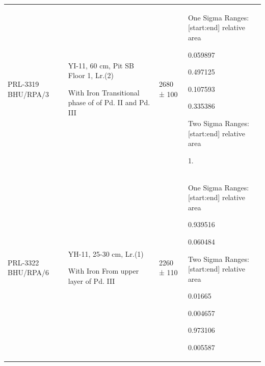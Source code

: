 {{{\begin{longtable}{|p{1.3cm}|p{1.6cm}|p{1.6cm}|p{4.4cm}|}
PRL-3319 BHU/RPA/3  & YI-11, 60 cm,  Pit SB Floor 1, Lr.(2) \par With Iron Transitional phase of of Pd. II and Pd. III & 2680 ± 100  & One Sigma Ranges: [start:end] relative area \par  [cal BC 894: cal BC 873] 0.059897\par  [cal BC 849: cal BC 734] 0.497125\par  [cal BC 690: cal BC 662] 0.107593 \par  [cal BC 649: cal BC 546] 0.335386\par Two Sigma Ranges: [start:end] relative area\par  [cal BC 926: cal BC 413] 1.\\
PRL-3322  BHU/RPA/6 & YH-11, 25-30 cm, Lr.(1)\par With Iron From upper layer of Pd. III & 2260 ± 110 & One Sigma Ranges: [start:end] relative area \par [cal BC 387: cal BC 159] 0.939516 \par [cal BC 134: cal BC 116] 0.060484 \par Two Sigma Ranges: [start:end] relative area \par [cal BC 507: cal BC 459] 0.01665 \par [cal BC 453: cal BC 439] 0.004657 \par [cal BC 419: cal AD 31] 0.973106 \par [cal AD 37: cal AD 52] 0.005587
\end{longtable}
}}}

\theendnotes 

\label{endchapter3}
